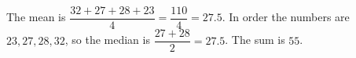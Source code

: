 The mean is $\dfrac{32+27+28+23}{4}=\dfrac{110}{4}=27.5$. In order the numbers are $23,27,28,32$, so the median is $\dfrac{27+28}{2}=27.5$. The sum is $\boxed{55}$.
